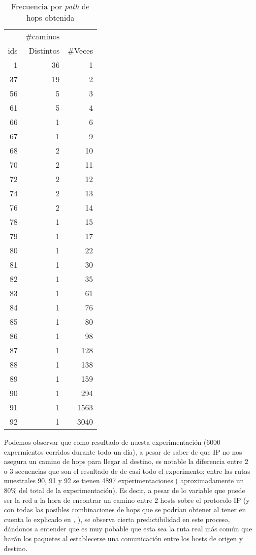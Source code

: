 \begin{table}[h]
    \centering
    \begin{tabular}{r | r | r}
            &\#caminos  & \\
        ids &Distintos  &\#Veces\\
        \hline\hline
        1& 36& 1\\
        37& 19& 2\\
        56& 5& 3\\
        61& 5& 4\\
        66& 1& 6\\
        67& 1& 9\\
        68& 2& 10\\
        70& 2& 11\\
        72& 2& 12\\
        74& 2& 13\\
        76& 2& 14\\
        78& 1& 15\\
        79& 1& 17\\
        80& 1& 22\\
        81& 1& 30\\
        82& 1& 35\\
        83& 1& 61\\
        84& 1& 76\\
        85& 1& 80\\
        86& 1& 98\\
        87& 1& 128\\
        88& 1& 138\\
        89& 1& 159\\
        90& 1& 294\\
        91& 1& 1563\\
        92& 1& 3040\\
        \hline\hline
    \end{tabular}
    \bigskip
    \caption{Frecuencia por \emph{path} de hops obtenida}
    \label{tab:mcgill_sec_hops}
\end{table}

\par Podemos observar que como resultado de nuesta experimentaci\'on (6000
expermientos corridos durante todo un d\'ia), a pesar de saber de que IP
no nos asegura un camino de hops para llegar al destino, es notable la diferencia
entre 2 o 3 secuencias que son el resultado de de cas\'i todo el experimento:
entre las rutas muestrales 90, 91 y 92 se tienen 4897 experimentaciones (
aproximadamente un 80\% del total de la experimentaci\'on). Es decir, a pesar
de lo variable que puede ser la red a la hora de encontrar un camino entre 2
hosts sobre el protocolo IP (y con todas las posibles combinaciones de hops que
se podr\'ian obtener al tener en cuenta lo explicado en \emph{,
}), se observa cierta predictibilidad en este proceso,
d\'andonos a entender que es muy pobable que esta sea la ruta real m\'as com\'un
que har\'an los paquetes al establecerse una comunicaci\'on entre los hosts
de origen y destino.

